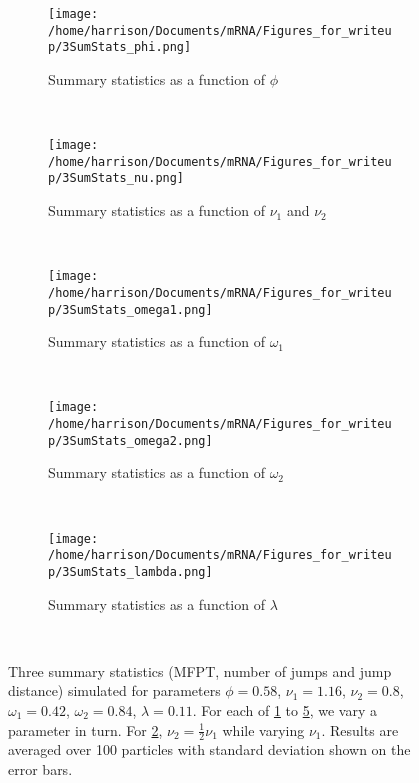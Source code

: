\documentclass[twocolumn]{biophys}
\begin{document}
\begin{figure}
        \centering
        \begin{subfigure}[h]{0.95\columnwidth}
                \texttt{[image: /home/harrison/Documents/mRNA/Figures\_for\_writeup/3SumStats\_phi.png]}
                \caption{Summary statistics as a function of $\phi$}
                \label{fig:phi}
        \end{subfigure}%
        
        
        ~ %
        \begin{subfigure}[h]{0.95\columnwidth}
                \texttt{[image: /home/harrison/Documents/mRNA/Figures\_for\_writeup/3SumStats\_nu.png]}
                \caption{Summary statistics as a function of $\nu_1$ and $\nu_2$}
                \label{fig:nu1}
        \end{subfigure}
         
         ~
         
         \begin{subfigure}[h]{0.95\columnwidth}
                \texttt{[image: /home/harrison/Documents/mRNA/Figures\_for\_writeup/3SumStats\_omega1.png]}
                \caption{Summary statistics as a function of $\omega_1$}
                \label{fig:omega1}
        \end{subfigure}%
        
        ~ 
   
    \begin{subfigure}[h]{0.95\columnwidth}
                \texttt{[image: /home/harrison/Documents/mRNA/Figures\_for\_writeup/3SumStats\_omega2.png]}
                \caption{Summary statistics as a function of $\omega_2$}
                \label{fig:omega2}
        \end{subfigure}%
        
        
        ~ 
        
         \begin{subfigure}[h]{0.95\columnwidth}
                \texttt{[image: /home/harrison/Documents/mRNA/Figures\_for\_writeup/3SumStats\_lambda.png]}
                \caption{Summary statistics as a function of $\lambda$}
                \label{fig:lambda}
        \end{subfigure}%
        
        
        ~ 
        \caption{Three summary statistics (MFPT, number of jumps and jump distance) simulated for parameters $\phi=0.58$, $\nu_1=1.16$, $\nu_2=0.8$, $\omega_1=0.42$, $\omega_2=0.84$, $\lambda=0.11$. For each of \ref{fig:phi} to \ref{fig:lambda}, we vary a parameter in turn. 
        For \ref{fig:nu1}, $\nu_2=\frac{1}{2}\nu_1$ while varying $\nu_1$. Results are averaged over 100 particles with standard deviation shown on the error bars.}
        \label{FIG:Sensitivity_analysis}
\end{figure}
\end{document}
